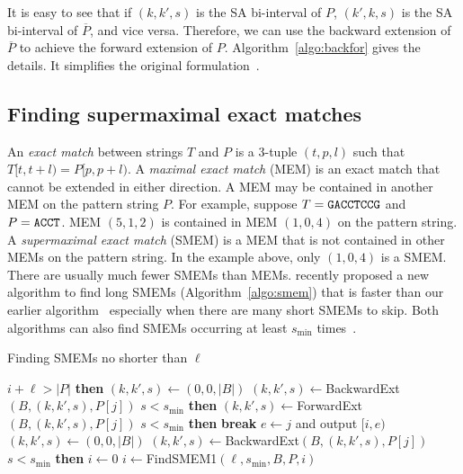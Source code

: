 \documentclass[webpdf,contemporary,large,namedate]{oup-authoring-template}%
\begin{document}
It is easy to see that if $(k,k',s)$ is the SA bi-interval of $P$, $(k',k,s)$ is the SA bi-interval of $\overline{P}$, and vice versa.
Therefore, we can use the backward extension of $\overline{P}$ to achieve the forward extension of $P$.
Algorithm~\ref{algo:backfor} gives the details.
It simplifies the original formulation~\citep{Li:2012fk}.

\subsection{Finding supermaximal exact matches}

An \emph{exact match} between strings $T$ and $P$ is a 3-tuple $(t,p,l)$ such that $T[t,t+l)=P[p,p+l)$.
A \emph{maximal exact match} (MEM) is an exact match that cannot be extended in either direction.
A MEM may be contained in another MEM on the pattern string $P$.
For example, suppose $T={\tt GACCTCCG}$ and $P={\tt ACCT}$.
MEM $(5,1,2)$ is contained in MEM $(1,0,4)$ on the pattern string.
A \emph{supermaximal exact match} (SMEM) is a MEM that is not contained in other MEMs on the pattern string.
In the example above, only $(1,0,4)$ is a SMEM.
There are usually much fewer SMEMs than MEMs.
\citet{DBLP:conf/dlt/Gagie24} recently proposed a new algorithm to find long SMEMs (Algorithm~\ref{algo:smem})
that is faster than our earlier algorithm~\citep{Li:2012fk}
especially when there are many short SMEMs to skip.
Both algorithms can also find SMEMs occurring at least $s_{\min}$ times~\citep{DBLP:conf/cpm/TatarnikovFKG23}.

\begin{algorithm}[b]
	\caption{Finding SMEMs no shorter than $\ell$~\citep{DBLP:conf/dlt/Gagie24}}\label{algo:smem}
	\begin{algorithmic}[1]
			 $i+\ell>|P|$ {\bf then} 
			\State $(k,k',s)\gets(0,0,|B|)$
				\State $(k,k',s)\gets${\sc BackwardExt}$(B,(k,k',s),P[j])$
				 $s<s_{\min}$ {\bf then} 
			\EndFor
				\State $(k,k',s)\gets${\sc ForwardExt}$(B,(k,k',s),P[j])$
				 $s<s_{\min}$ {\bf then} {\bf break}
			\EndFor
			\State $e\gets j$ and output $[i,e)$
			\State $(k,k',s)\gets(0,0,|B|)$
				\State $(k,k',s)\gets${\sc BackwardExt}$(B,(k,k',s),P[j])$
				 $s<s_{\min}$ {\bf then} 
			\EndFor
		\EndProcedure
			\State $i\gets0$
			\Repeat
			\State $i\gets${\sc FindSMEM1}$(\ell,s_{\min},B,P,i)$
		\EndProcedure
	\end{algorithmic}
\end{algorithm}
\end{document}
